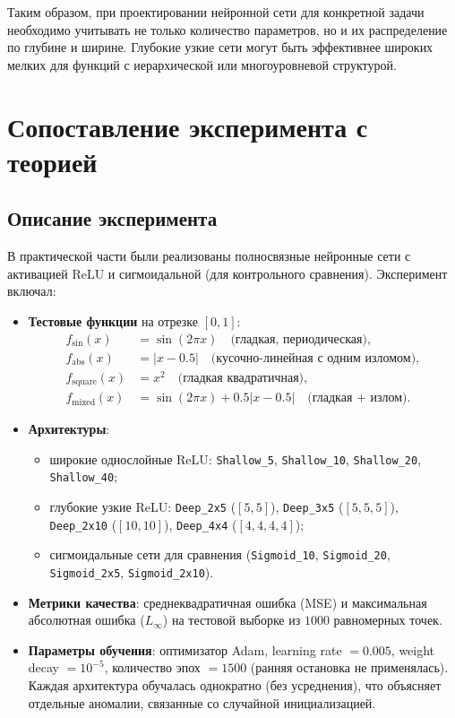 \documentclass[12pt]{article}
\begin{document}
	Таким образом, при проектировании нейронной сети для конкретной задачи необходимо учитывать не только количество параметров, но и их распределение по глубине и ширине. Глубокие узкие сети могут быть эффективнее широких мелких для функций с иерархической или многоуровневой структурой.
	
	\section{Сопоставление эксперимента с теорией}
	
	\subsection{Описание эксперимента}
	
	В практической части были реализованы полносвязные нейронные сети с активацией ReLU и сигмоидальной (для контрольного сравнения). Эксперимент включал:
	
	\begin{itemize}
		\item \textbf{Тестовые функции} на отрезке $[0,1]$:
		\begin{align*}
			f_{\sin}(x) &= \sin(2\pi x) \quad \text{(гладкая, периодическая)},\\
			f_{\text{abs}}(x) &= |x-0.5| \quad \text{(кусочно-линейная с одним изломом)},\\
			f_{\text{square}}(x) &= x^{2} \quad \text{(гладкая квадратичная)},\\
			f_{\text{mixed}}(x) &= \sin(2\pi x) + 0.5|x-0.5| \quad \text{(гладкая + излом)}.
		\end{align*}
		\item \textbf{Архитектуры}:
		\begin{itemize}
			\item широкие однослойные ReLU: \texttt{Shallow\_5}, \texttt{Shallow\_10}, \texttt{Shallow\_20}, \texttt{Shallow\_40};
			\item глубокие узкие ReLU: \texttt{Deep\_2x5} ($[5,5]$), \texttt{Deep\_3x5} ($[5,5,5]$), \texttt{Deep\_2x10} ($[10,10]$), \texttt{Deep\_4x4} ($[4,4,4,4]$);
			\item сигмоидальные сети для сравнения (\texttt{Sigmoid\_10}, \texttt{Sigmoid\_20}, \texttt{Sigmoid\_2x5}, \texttt{Sigmoid\_2x10}).
		\end{itemize}
		\item \textbf{Метрики качества}: среднеквадратичная ошибка (MSE) и максимальная абсолютная ошибка ($L_{\infty}$) на тестовой выборке из $1000$ равномерных точек.
		\item \textbf{Параметры обучения}: оптимизатор Adam, learning rate $=0.005$, weight decay $=10^{-5}$, количество эпох $=1500$ (ранняя остановка не применялась). Каждая архитектура обучалась однократно (без усреднения), что объясняет отдельные аномалии, связанные со случайной инициализацией.
	\end{itemize}
	
\end{document}
